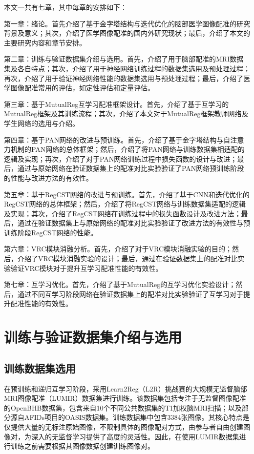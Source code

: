 本文一共有七章，其中每章的安排如下：

第一章：绪论。首先介绍了基于金字塔结构与迭代优化的脑部医学图像配准的研究背景及意义；其次，介绍了医学图像配准的国内外研究现状；最后，介绍了本文的主要研究内容和章节安排。

第二章：训练与验证数据集介绍与选用。首先，介绍了用于脑部配准的MRI数据集及各自特点；其次，介绍了用于神经网络训练过程的数据集选用及预处理过程；再次，介绍了用于验证神经网络性能的数据集选用与预处理过程；最后，介绍了医学图像配准常用的评估，如定性评估和定量评估。

第三章：基于MutualReg互学习配准框架设计。首先，介绍了基于互学习的MutualReg框架及其训练流程；其次，介绍了本文对于MutualReg框架教师网络及学生网络的选用与介绍。

第四章：基于PAN网络的改进与预训练。首先，介绍了基于金字塔结构与自注意力机制的PAN网络的总体框架；然后，介绍了将PAN网络与训练数据集相适配的逻辑及实现；再次，介绍了对于PAN网络训练过程中损失函数的设计与改进；最后，通过与原始网络在验证数据集上的配准对比实验验证了PAN网络预训练阶段的性能与改进方法的有效性。

第五章：基于RegCST网络的改进与预训练。首先，介绍了基于CNN和迭代优化的RegCST网络的总体框架；然后，介绍了将RegCST网络与训练数据集适配的逻辑及实现；其次，介绍了RegCST网络在训练过程中的损失函数设计及改进方法；最后，通过在验证数据集上与原始网络的配准对比实验验证了改进方法的有效性与预训练阶段RegCST网络的性能。

第六章：VRC模块消融分析。首先，介绍了对于VRC模块消融实验的目的；然后，介绍了VRC模块消融实验的设计；最后，通过在验证数据集上的配准对比实验验证VRC模块对于提升互学习配准性能的有效性。

第七章：互学习优化。首先，介绍了基于MutualReg的互学习优化实验设计；然后，通过不同互学习阶段网络在验证数据集上的配准对比实验验证了互学习对于提升配准性能的有效性。

\chapter{训练与验证数据集介绍与选用}

\section{训练数据集选用}

在预训练和递归互学习阶段，采用Learn2Reg（L2R）挑战赛的大规模无监督脑部MRI图像配准（LUMIR）数据集进行训练。该数据集包括专注于无监督图像配准的OpenBHB\cite{dufumier2022openbhb}数据集，包含来自10个不同公共数据集的T1加权脑MRI扫描；以及部分源自AFIDs项目的OASIS\cite{marcus2007open}数据集。训练数据集中包含3384张图像。其核心特点是仅提供大量的无标注原始图像，不限制具体的图像配对方式，由参与者自由创建图像对，为深入的无监督学习提供了高度的灵活性。因此，在使用LUMIR数据集进行训练之前需要根据其图像数据创建训练图像对。

